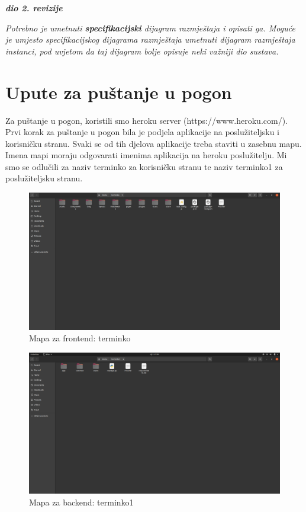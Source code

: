 			\textbf{\textit{dio 2. revizije}}
			
			 \textit{Potrebno je umetnuti \textbf{specifikacijski} dijagram razmještaja i opisati ga. Moguće je umjesto specifikacijskog dijagrama razmještaja umetnuti dijagram razmještaja instanci, pod uvjetom da taj dijagram bolje opisuje neki važniji dio sustava.}
			
			\eject 
		
		\section{Upute za puštanje u pogon}
		
			Za puštanje u pogon, koristili smo heroku server (https://www.heroku.com/). Prvi korak za puštanje u pogon bila je podjela aplikacije na poslužiteljsku i korisničku stranu. Svaki se od tih djelova aplikacije treba staviti u zasebnu mapu. Imena mapi moraju odgovarati imenima aplikacija na heroku poslužitelju. Mi smo se odlučili za naziv terminko za korisničku stranu te naziv terminko1 za poslužiteljsku stranu.
			
			\begin{figure}[H]
				\centering
				\includegraphics[scale=0.25]{slike/FrontendMapa.PNG}
				\caption{Mapa za frontend: terminko}
				\label{fig:promjene}
			\end{figure}
			
			\begin{figure}[H]
				\centering
				\includegraphics[scale=0.25]{slike/BackendMapa.PNG}
				\caption{Mapa za backend: terminko1}
				\label{fig:promjene}
			\end{figure}
		
